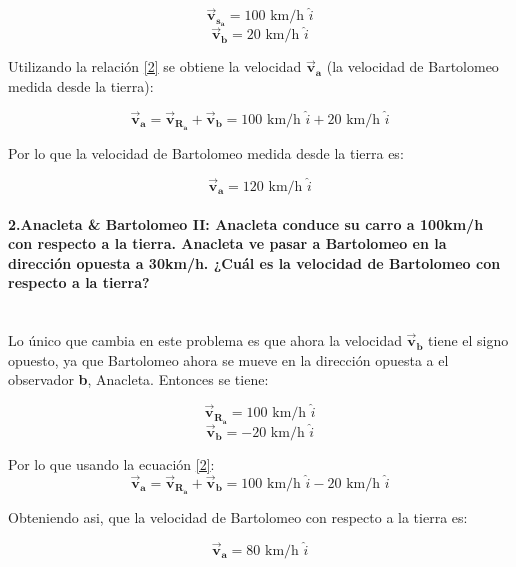 \documentclass[a4paper,11pt]{article}
\theoremstyle{mytheor}
\begin{document}
$$ \vec{\textbf{v}}_{\textbf{s}_\textbf{a}} = 100 \text{ km/h } \hat{i} $$
$$ \vec{\textbf{v}}_{\textbf{b}} = 20 \text{ km/h } \hat{i}$$ 


Utilizando la relación \ref{2} se obtiene la velocidad $\vec{\textbf{v}}_{\textbf{a}}$ (la velocidad de Bartolomeo medida desde la tierra):

\begin{equation}
\vec{\textbf{v}}_{\textbf{a}} = \vec{\textbf{v}}_{\textbf{R}_\textbf{a}} + \vec{\textbf{v}}_{\textbf{b}} = 100 \text{ km/h }\hat{i} + 20 \text{ km/h } \hat{i}
\end{equation}

Por lo que la velocidad de Bartolomeo medida desde la tierra es:

\begin{equation}
\vec{\textbf{v}}_{\textbf{a}}= 120 \text{ km/h } \hat{i}
\end{equation}


\paragraph{2.Anacleta \& Bartolomeo II: Anacleta conduce su carro a 100km/h con respecto a la tierra. Anacleta ve pasar a Bartolomeo en la dirección opuesta a 30km/h. ¿Cuál es la velocidad de Bartolomeo con respecto a la tierra?\\
	\\	}

Lo único que cambia en este problema es que ahora la velocidad $\vec{\textbf{v}}_{\textbf{b}}$ tiene el signo opuesto, ya que Bartolomeo ahora se mueve en la dirección opuesta a el observador \textbf{b}, Anacleta. Entonces se tiene:


$$ \vec{\textbf{v}}_{\textbf{R}_\textbf{a}} = 100 \text{ km/h } \hat{i} $$
$$ \vec{\textbf{v}}_{\textbf{b}} = -20 \text{ km/h } \hat{i}$$ 

Por lo que usando la ecuación \ref{2}:
\begin{equation}
\vec{\textbf{v}}_{\textbf{a}} = \vec{\textbf{v}}_{\textbf{R}_\textbf{a}} + \vec{\textbf{v}}_{\textbf{b}} = 100 \text{ km/h }\hat{i} - 20 \text{ km/h } \hat{i}
\end{equation}

Obteniendo asi, que la velocidad de Bartolomeo con respecto a la tierra es:

\begin{equation}
\vec{\textbf{v}}_{\textbf{a}}= 80 \text{ km/h } \hat{i}
\end{equation}
\end{document}
